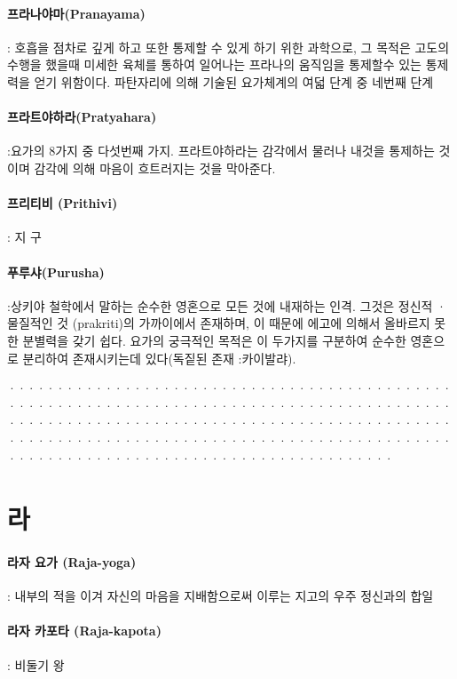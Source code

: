 \documentclass[12pt, a4paper, oneside]{book}
\let\stdsection\section
\renewcommand\section{\newpage\stdsection}
\begin{document}
\paragraph{프라나야마(Pranayama)} : 호흡을 점차로 깊게 하고 또한 통제할 수 있게 하기 위한 과학으로, 그 목적은 고도의 수행을 했을때 미세한 육체를 통하여 일어나는 프라나의 움직임을 통제할수 있는 통제력을 얻기 위함이다. 파탄자리에 의해 기술된 요가체계의 여덟 단계 중 네번째 단계

\paragraph{프라트야하라(Pratyahara)} :요가의 8가지 중 다섯번째 가지. 프라트야하라는 감각에서 물러나 내것을 통제하는 것이며 감각에 의해 마음이 흐트러지는 것을 막아준다.

\paragraph{프리티비 (Prithivi)} : 지 구

\paragraph{푸루샤(Purusha)} :상키야 철학에서 말하는 순수한 영혼으로 모든 것에 내재하는 인격. 그것은 정신적 ·물질적인 것 (prakriti)의 가까이에서 존재하며, 이 때문에 에고에 의해서 올바르지 못한 분별력을 갖기 쉽다. 요가의 궁극적인 목적은 이 두가지를 구분하여 순수한 영혼으로 분리하여 존재시키는데 있다(독짙된 존재 :카이발랴).

································································································································································································································

\newpage
\section{라}

\paragraph{라자 요가 (Raja-yoga)} : 내부의 적을 이겨 자신의 마음을 지배함으로써 이루는 지고의 우주 정신과의 합일

\paragraph{라자 카포타 (Raja-kapota)} : 비둘기 왕
\end{document}
